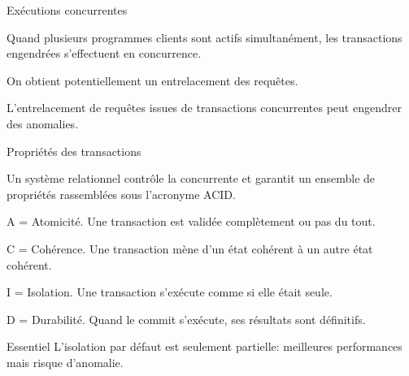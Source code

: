 \begin{frame}{Exécutions concurrentes}


Quand plusieurs programmes clients sont actifs simultanément, 
les transactions engendrées s'effectuent \alert{en concurrence}.

\vfill

\vfill


On obtient potentiellement un \alert{entrelacement des requêtes}.

\begin{blocgauche}
L'entrelacement de requêtes issues de transactions concurrentes 
\alert{peut} engendrer
des anomalies.
\end{blocgauche}

\end{frame}

\begin{frame}{Propriétés des transactions}

Un système relationnel contrôle la concurrente et
garantit un ensemble de propriétés rassemblées sous l'acronyme ACID.

\begin{redbullet}

  \item  \alert{A = Atomicité}. Une transaction est validée complètement ou pas du tout.
  
  \item  \alert{C = Cohérence}. Une transaction mène d'un état cohérent à un autre état cohérent.
  
  \item \alert{I = Isolation}. Une transaction s'exécute comme si elle était seule.
  
   \item \alert{D = Durabilité}. Quand le commit s'exécute, ses résultats sont définitifs.
\end{redbullet}

\begin{blocgauche}
\begin{defblock}{Essentiel}
L'isolation \alert{par défaut} est seulement partielle: \alert{meilleures
performances} mais \alert{risque d'anomalie}.
\end{defblock}
\end{blocgauche}
\end{frame}

